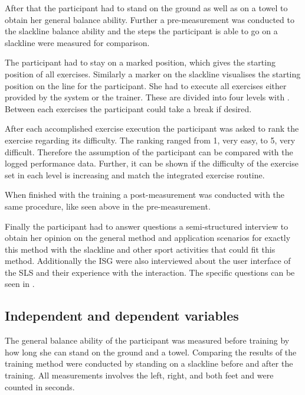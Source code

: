 After that the participant had to stand on the ground as well as on a towel to obtain her general balance ability.
Further a pre-measurement was conducted to the slackline balance ability and the steps the participant is able to go on a slackline were measured for comparison.

The participant had to stay on a marked position, which gives the starting position of all exercises. Similarly a marker on the slackline visualises the starting position on the line for the participant. She had to execute all exercises either provided by the system or the trainer. These are divided into four levels with . Between each exercises the participant could take a break if desired.

After each accomplished exercise execution the participant was asked to rank the exercise regarding its difficulty. The ranking ranged from 1, very easy, to 5, very difficult. Therefore the assumption of the participant can be compared with the logged performance data. Further, it can be shown if the difficulty of the exercise set in each level is increasing and match the integrated exercise routine.



When finished with the training a post-measurement was conducted with the same procedure, like seen above in the pre-measurement.

Finally the participant had to answer questions a semi-structured interview to obtain her opinion on the general method and application scenarios for exactly this method with the slackline and other sport activities that could fit this method. Additionally the ISG were also interviewed about the user interface of the SLS and their experience with the interaction. The specific questions can be seen in .

\subsection{Independent and dependent variables}\label{6_variables}
The general balance ability of the participant was measured before training by how long she can stand on the ground and a towel. Comparing the results of the training method were conducted by standing on a slackline before and after the training. All measurements involves the left, right, and both feet and were counted in seconds. 

